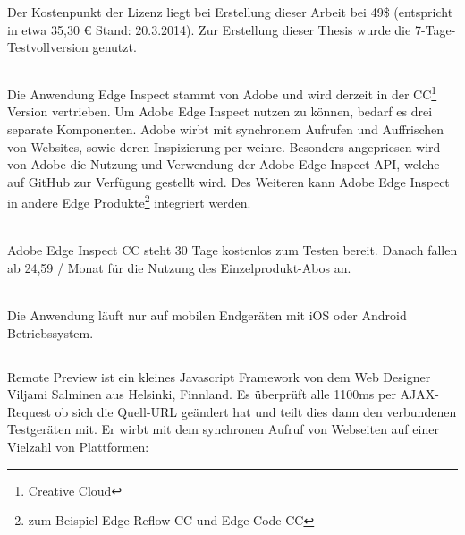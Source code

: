 	Der Kostenpunkt der Lizenz liegt bei Erstellung dieser Arbeit bei 49\$ (entspricht in etwa 35,30 € Stand: 20.3.2014). Zur Erstellung dieser Thesis wurde die 7-Tage-Testvollversion genutzt.
	
	\subsection{}
	Die Anwendung Edge Inspect stammt von Adobe und wird derzeit in der CC\footnote{Creative Cloud} Version vertrieben. Um Adobe Edge Inspect nutzen zu können, bedarf es drei separate Komponenten. Adobe wirbt mit synchronem Aufrufen und Auffrischen von Websites, sowie deren Inspizierung per weinre. Besonders angepriesen wird von Adobe die Nutzung und Verwendung der Adobe Edge Inspect API, welche auf GitHub zur Verfügung gestellt wird. Des Weiteren kann Adobe Edge Inspect in andere Edge Produkte\footnote{zum Beispiel Edge Reflow CC und Edge Code CC} integriert werden. 
	
	\\Adobe Edge Inspect CC steht 30 Tage kostenlos zum Testen bereit. Danach fallen ab 24,59 / Monat für die Nutzung des Einzelprodukt-Abos an.
	
	\\Die Anwendung läuft nur auf mobilen Endgeräten mit iOS oder Android Betriebssystem.
	
	\subsection{}
	Remote Preview ist ein kleines Javascript Framework von dem Web Designer Viljami Salminen aus Helsinki, Finnland. Es überprüft alle 1100ms per AJAX-Request ob sich die Quell-URL geändert hat und teilt dies dann den verbundenen Testgeräten mit. Er wirbt mit dem synchronen Aufruf von Webseiten auf einer Vielzahl von Plattformen: 
	

